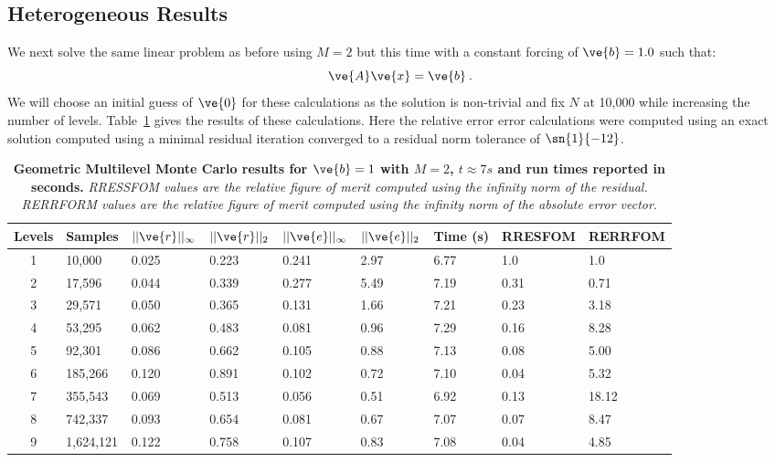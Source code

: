 \documentclass[note]{TechNote}
\begin{document}
\subsection{Heterogeneous Results}
We next solve the same linear problem as before using $M=2$ but this
time with a constant forcing of $\ve{b}=1.0$ such that:
\begin{equation}
  \ve{A}\ve{x} = \ve{b}\:.
  \label{eq:heterogeneous_problem}
\end{equation}
We will choose an initial guess of $\ve{0}$ for these calculations as
the solution is non-trivial and fix $N$ at 10,000 while increasing the
number of levels. Table~\ref{tab:heterogeneous_fixed_N} gives the
results of these calculations. Here the relative error error
calculations were computed using an exact solution computed using a
minimal residual iteration converged to a residual norm tolerance of
$\sn{1}{-12}$.
\begin{table}[h!]
  \begin{center}
    \begin{tabular}{cllllllll}\hline\hline
      \multicolumn{1}{c}{\textbf{Levels}} &
      \multicolumn{1}{l}{\textbf{Samples}} &
      \multicolumn{1}{l}{\textbf{$||\ve{r}||_{\infty}$}} &
      \multicolumn{1}{l}{\textbf{$||\ve{r}||_{2}$}} &
      \multicolumn{1}{l}{\textbf{$||\ve{e}||_{\infty}$}} &
      \multicolumn{1}{l}{\textbf{$||\ve{e}||_{2}$}} &
      \multicolumn{1}{l}{\textbf{Time (s)}} &
      \multicolumn{1}{l}{\textbf{RRESFOM}} &
      \multicolumn{1}{l}{\textbf{RERRFOM}} \\
      \hline
      1 & 10,000 & 0.025 & 0.223 & 0.241 & 2.97 & 6.77 & 1.0 & 1.0 \\
      2 & 17,596 & 0.044 & 0.339 & 0.277 & 5.49 & 7.19 & 0.31 & 0.71 \\
      3 & 29,571 & 0.050 & 0.365 & 0.131 & 1.66 & 7.21 & 0.23 & 3.18 \\
      4 & 53,295 & 0.062 & 0.483 & 0.081 & 0.96 & 7.29 & 0.16 & 8.28 \\
      5 & 92,301 & 0.086 & 0.662 & 0.105 & 0.88 & 7.13 & 0.08 & 5.00 \\
      6 & 185,266 & 0.120 & 0.891 & 0.102 & 0.72 & 7.10 & 0.04 & 5.32 \\
      7 & 355,543 & 0.069 & 0.513 & 0.056 & 0.51 & 6.92 & 0.13 & 18.12 \\
      8 & 742,337 & 0.093 & 0.654 & 0.081 & 0.67 & 7.07 & 0.07 & 8.47 \\
      9 & 1,624,121 & 0.122 & 0.758 & 0.107 & 0.83 & 7.08 & 0.04 &
      4.85 \\
      \hline\hline
    \end{tabular}
  \end{center}
  \caption{\textbf{Geometric Multilevel Monte Carlo results for
      $\ve{b} = 1$ with $M = 2$, $t \approx 7s$ and run times reported
      in seconds.} \textit{RRESSFOM values are the relative figure of
      merit computed using the infinity norm of the residual. RERRFORM
    values are the relative figure of merit computed using the
    infinity norm of the absolute error vector.}}
  \label{tab:heterogeneous_fixed_N}
\end{table}
\end{document}
